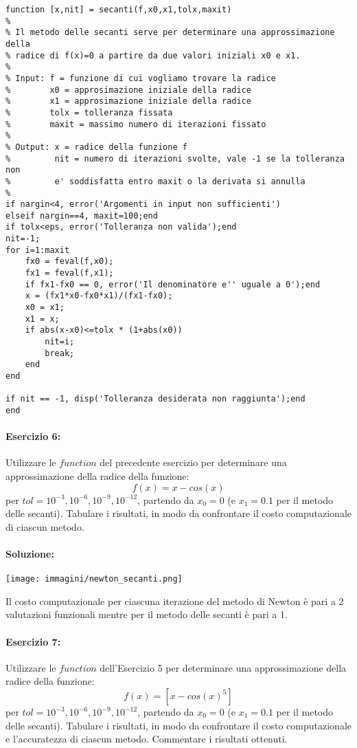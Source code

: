 \documentclass[12pt]{article}
\begin{document}
\begin{lstlisting}[frame=single]
function [x,nit] = secanti(f,x0,x1,tolx,maxit)
% 
% Il metodo delle secanti serve per determinare una approssimazione della
% radice di f(x)=0 a partire da due valori iniziali x0 e x1.
% 
% Input: f = funzione di cui vogliamo trovare la radice
%        x0 = approsimazione iniziale della radice
%        x1 = approsimazione iniziale della radice
%        tolx = tolleranza fissata
%        maxit = massimo numero di iterazioni fissato
%
% Output: x = radice della funzione f
%         nit = numero di iterazioni svolte, vale -1 se la tolleranza non
%         e' soddisfatta entro maxit o la derivata si annulla
%
if nargin<4, error('Argomenti in input non sufficienti')
elseif nargin==4, maxit=100;end
if tolx<eps, error('Tolleranza non valida');end
nit=-1;
for i=1:maxit
    fx0 = feval(f,x0);
    fx1 = feval(f,x1);
    if fx1-fx0 == 0, error('Il denominatore e'' uguale a 0');end
    x = (fx1*x0-fx0*x1)/(fx1-fx0);
    x0 = x1;
    x1 = x;
    if abs(x-x0)<=tolx * (1+abs(x0))
        nit=i;
        break;
    end
end

if nit == -1, disp('Tolleranza desiderata non raggiunta');end
end
\end{lstlisting}
\paragraph{Esercizio 6:}Utilizzare le \(function\) del precedente esercizio per determinare una approssimazione della radice della funzione:
$$f(x)=x-cos(x)$$
per \(tol = 10^{-3}, 10^{-6}, 10^{-9}, 10^{-12}\), partendo da \(x_0 = 0\) (e \(x_1 = 0.1\) per il metodo delle secanti). 
Tabulare i risultati, in modo da confrontare il costo computazionale di ciascun metodo.
\paragraph{Soluzione:}
\begin{center}
    \texttt{[image: immagini/newton\_secanti.png]}
\end{center}
Il costo computazionale per ciascuna iterazione del metodo di Newton è pari a 2 valutazioni funzionali mentre per il metodo delle secanti è pari a 1.


\paragraph{Esercizio 7:}Utilizzare le \(function\) dell'Esercizio 5 per determinare una approssimazione della radice della funzione:
$$f(x)=[x-cos(x)^5]$$
per \(tol = 10^{-3}, 10^{-6}, 10^{-9}, 10^{-12}\), partendo da \(x_0 = 0\) (e \(x_1 = 0.1\) per il metodo delle secanti). 
Tabulare i risultati, in modo da confrontare il costo computazionale e l’accuratezza di ciascun metodo. Commentare i risultati ottenuti.\pagebreak
\end{document}

